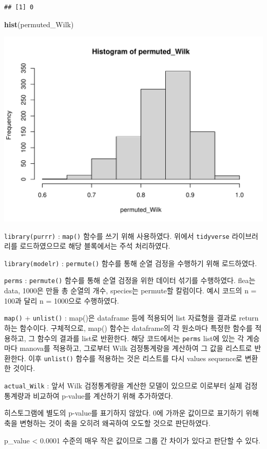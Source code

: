 \documentclass[
]{article}
\newenvironment{Shaded}{\begin{snugshade}}{\end{snugshade}}
\newcommand{\FunctionTok}[1]{\textcolor[rgb]{0.13,0.29,0.53}{\textbf{#1}}}
\newcommand{\NormalTok}[1]{#1}
\begin{document}
\begin{verbatim}
## [1] 0
\end{verbatim}

\begin{Shaded}
\begin{Highlighting}[]
\FunctionTok{hist}\NormalTok{(permuted\_Wilk)}
\end{Highlighting}
\end{Shaded}

\begin{center}\includegraphics[width=0.8\linewidth]{multivariate_lab_hw2_files/figure-latex/unnamed-chunk-10-1} \end{center}

\texttt{library(purrr)} : \texttt{map()} 함수를 쓰기 위해 사용하였다.
위에서 \texttt{tidyverse} 라이브러리를 로드하였으므로 해당 블록에서는
주석 처리하였다.

\texttt{library(modelr)} : \texttt{permute()} 함수를 통해 순열 검정을
수행하기 위해 로드하였다.

\texttt{perms} : \texttt{permute()} 함수를 통해 순열 검정을 위한 데이터
섞기를 수행하였다. flea는 data, 1000은 만들 총 순열의 개수, species는
permute할 칼럼이다. 예시 코드의 n = 100과 달리 n = 1000으로 수행하였다.

\texttt{map()} + \texttt{unlist()} : map()은 dataframe 등에 적용되어
list 자료형을 결과로 return하는 함수이다. 구체적으로, map() 함수는
dataframe의 각 원소마다 특정한 함수를 적용하고, 그 함수의 결과를 list로
반환한다. 해당 코드에서는 \texttt{perms} list에 있는 각 계승마다
manova를 적용하고, 그로부터 Wilk 검정통계랑을 계산하여 그 값을 리스트로
반환한다. 이후 \texttt{unlist()} 함수를 적용하는 것은 리스트를 다시
values sequence로 변환한 것이다.

\texttt{actual\_Wilk} : 앞서 Wilk 검정통계량을 계산한 모델이 있으므로
이로부터 실제 검정통계량과 비교하여 p-value를 계산하기 위해 추가하였다.

히스토그램에 별도의 p-value를 표기하지 않았다. 0에 가까운 값이므로
표기하기 위해 축을 변형하는 것이 축을 오히려 왜곡하여 오도할 것으로
판단하였다.

p\_value \textless{} 0.0001 수준의 매우 작은 값이므로 그룹 간 차이가
있다고 판단할 수 있다.
\end{document}
